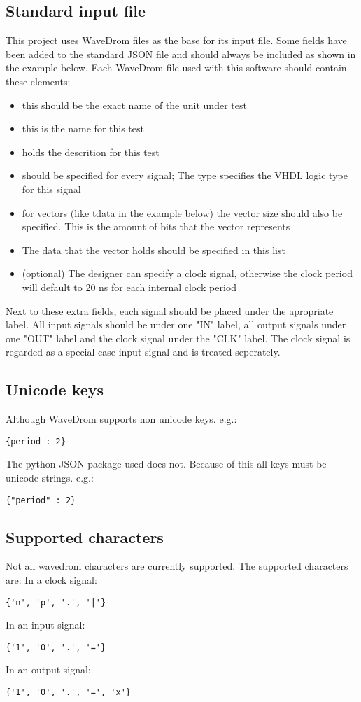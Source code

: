 \subsection{Standard input file}
This project uses WaveDrom files as the base for its input file. Some fields have been added to the standard JSON file and should always be included as shown in the example below. Each WaveDrom file used with this software should contain these elements:
\begin{itemize}
	\item [name(*):] this should be the exact name of the unit under test
	\item [test:] this is the name for this test
	\item [description:] holds the descrition for this test
	\item [type:] should be specified for every signal; The type specifies the VHDL logic type for this signal
	\item [vector\_size:] for vectors (like tdata in the example below) the vector size should also be specified. This is the amount of bits that the vector represents
	\item [data:] The data that the vector holds should be specified in this list
	\item [clock\_period:] (optional) The designer can specify a clock signal, otherwise the clock period will default to 20 ns for each internal clock period
\end{itemize}
Next to these extra fields, each signal should be placed under the apropriate label. All input signals should be under one "IN" label, all output signals under one "OUT" label and the clock signal under the "CLK" label. The clock signal is regarded as a special case input signal and is treated seperately.\newpage
\subsection{Unicode keys}
Although WaveDrom supports non unicode keys. e.g.:
\begin{lstlisting}[style=json]
{period : 2}
\end{lstlisting}
The python JSON package used does not. Because of this all keys must be unicode strings. e.g.:
\begin{lstlisting}[style=json]
{"period" : 2}
\end{lstlisting}
\subsection{Supported characters}
Not all wavedrom characters are currently supported. The supported characters are:
\npar
In a clock signal: 
\begin{lstlisting}[style=json]
{'n', 'p', '.', '|'}
\end{lstlisting}
In an input signal: 
\begin{lstlisting}[style=json]
{'1', '0', '.', '='}
\end{lstlisting}
In an output signal: 
\begin{lstlisting}[style=json]
{'1', '0', '.', '=', 'x'}
\end{lstlisting}\newpage
